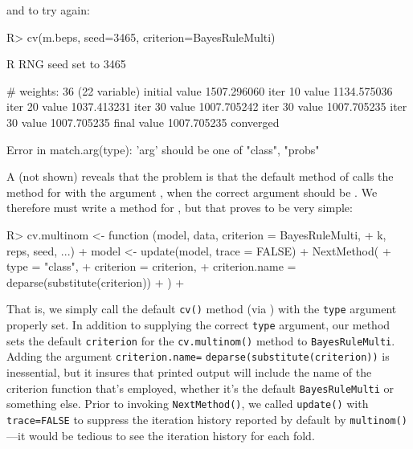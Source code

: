 \documentclass[
]{jss}
\begin{document}
and to try again:

\begin{CodeChunk}
\begin{CodeInput}
R> cv(m.beps, seed=3465, criterion=BayesRuleMulti)
\end{CodeInput}
\begin{CodeOutput}
R RNG seed set to 3465
\end{CodeOutput}
\begin{CodeOutput}
# weights:  36 (22 variable)
initial  value 1507.296060 
iter  10 value 1134.575036
iter  20 value 1037.413231
iter  30 value 1007.705242
iter  30 value 1007.705235
iter  30 value 1007.705235
final  value 1007.705235 
converged
\end{CodeOutput}
\begin{CodeOutput}
Error in match.arg(type): 'arg' should be one of "class", "probs"
\end{CodeOutput}
\end{CodeChunk}

A  (not shown) reveals that the problem is that the
default method of  calls the  method for
 with the argument , when the
correct argument should be . We therefore must write
a  method for , but that proves to be very
simple:

\begin{CodeChunk}
\begin{CodeInput}
R> cv.multinom <- function (model, data, criterion = BayesRuleMulti, 
+                          k, reps, seed, ...) {
+     model <- update(model, trace = FALSE)
+     NextMethod(
+       type = "class",
+       criterion = criterion,
+       criterion.name = deparse(substitute(criterion))
+     )
+   }
\end{CodeInput}
\end{CodeChunk}

That is, we simply call the default \texttt{cv()} method (via
) with the \texttt{type} argument properly set. In
addition to supplying the correct \texttt{type} argument, our method
sets the default \texttt{criterion} for the \texttt{cv.multinom()}
method to \texttt{BayesRuleMulti}. Adding the argument
\texttt{criterion.name=} \texttt{deparse(substitute(criterion))} is
inessential, but it insures that printed output will include the name of
the criterion function that's employed, whether it's the default
\texttt{BayesRuleMulti} or something else. Prior to invoking
\texttt{NextMethod()}, we called \texttt{update()} with
\texttt{trace=FALSE} to suppress the iteration history reported by
default by \texttt{multinom()}---it would be tedious to see the
iteration history for each fold.
\end{document}
